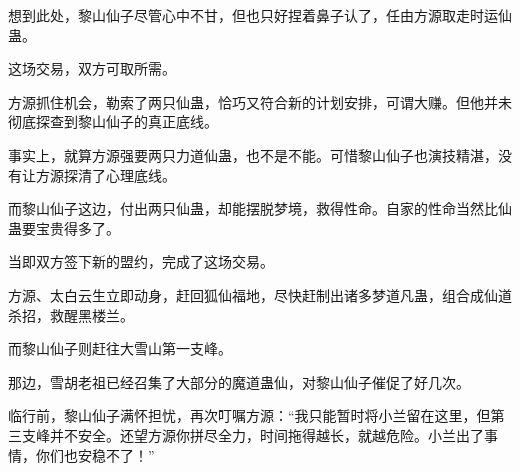 \begin{this_body}
想到此处，黎山仙子尽管心中不甘，但也只好捏着鼻子认了，任由方源取走时运仙蛊。

这场交易，双方可取所需。

方源抓住机会，勒索了两只仙蛊，恰巧又符合新的计划安排，可谓大赚。但他并未彻底探查到黎山仙子的真正底线。

事实上，就算方源强要两只力道仙蛊，也不是不能。可惜黎山仙子也演技精湛，没有让方源探清了心理底线。

而黎山仙子这边，付出两只仙蛊，却能摆脱梦境，救得性命。自家的性命当然比仙蛊要宝贵得多了。

当即双方签下新的盟约，完成了这场交易。

方源、太白云生立即动身，赶回狐仙福地，尽快赶制出诸多梦道凡蛊，组合成仙道杀招，救醒黑楼兰。

而黎山仙子则赶往大雪山第一支峰。

那边，雪胡老祖已经召集了大部分的魔道蛊仙，对黎山仙子催促了好几次。

临行前，黎山仙子满怀担忧，再次叮嘱方源：“我只能暂时将小兰留在这里，但第三支峰并不安全。还望方源你拼尽全力，时间拖得越长，就越危险。小兰出了事情，你们也安稳不了！”

\end{this_body}

